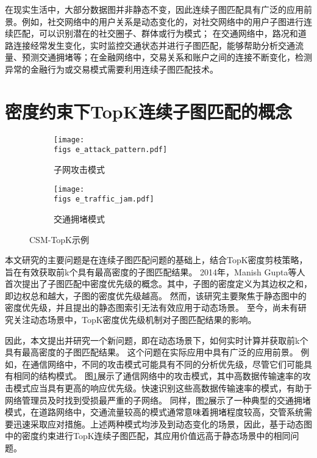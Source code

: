 在现实生活中，大部分数据图并非静态不变，因此连续子图匹配具有广泛的应用前景。例如，社交网络中的用户关系是动态变化的，对社交网络中的用户子图进行连续匹配，可以识别潜在的社交圈子、群体或行为模式；
在交通网络中，路况和道路连接经常发生变化，实时监控交通状态并进行子图匹配，能够帮助分析交通流量、预测交通拥堵等；在金融网络中，交易关系和账户之间的连接不断变化，检测异常的金融行为或交易模式需要利用连续子图匹配技术。


\section{密度约束下TopK连续子图匹配的概念}
\begin{figure}[h!]
    \def\wscorevone{0.49}
    \centering
        \begin{subfigure}[t]{\wscorevone\linewidth}
            \centering
            \resizebox{\linewidth}{!}
            {
                \texttt{[image: \\figs e\_attack\_pattern.pdf]}
            }
            \caption{子网攻击模式~\cite{static-topk-Gupta-DBLP:conf/icde/GuptaGYCH14}}
            \label{fig:example_attack_pattern}
        \end{subfigure}
        \hfill
        \begin{subfigure}[t]{\wscorevone\linewidth}
            \centering
            \resizebox{\linewidth}{!}
            {
                \texttt{[image: \\figs e\_traffic\_jam.pdf]}
            }
            \caption{交通拥堵模式~\cite{traffic-graph-matching-DBLP:journals/pvldb/SongGCW14}}
            \label{fig:example_traffic_jam}
        \end{subfigure}
        \label{fig:definition}
        \caption{CSM-TopK示例}
    \end{figure}
本文研究的主要问题是在连续子图匹配问题的基础上，结合TopK密度剪枝策略，旨在有效获取前k个具有最高密度的子图匹配结果。
2014年，Manish Gupta等人首次提出了子图匹配中密度优先级的概念\cite{static-topk-Gupta-DBLP:conf/icde/GuptaGYCH14}。其中，子图的密度定义为其边权之和，即边权总和越大，子图的密度优先级越高。
然而，该研究主要聚焦于静态图中的密度优先级，并且提出的静态图索引无法有效应用于动态场景。
至今，尚未有研究关注动态场景中，TopK密度优先级机制对子图匹配结果的影响。

因此，本文提出并研究一个新问题，即在动态场景下，如何实时计算并获取前k个具有最高密度的子图匹配结果。
这个问题在实际应用中具有广泛的应用前景。
例如，在通信网络中，不同的攻击模式可能具有不同的分析优先级，尽管它们可能具有相同的结构模式。
图\ref{fig:example_attack_pattern}展示了通信网络中的攻击模式\cite{static-topk-Gupta-DBLP:conf/icde/GuptaGYCH14}，其中高数据传输速率的攻击模式应当具有更高的响应优先级。快速识别这些高数据传输速率的模式，有助于网络管理员及时找到受损最严重的子网络。
同样，图\ref{fig:example_traffic_jam}展示了一种典型的交通拥堵模式\cite{traffic-graph-matching-DBLP:journals/pvldb/SongGCW14}，在道路网络中，交通流量较高的模式通常意味着拥堵程度较高，交管系统需要迅速采取应对措施。上述两种模式均涉及到动态变化的场景，因此，基于动态图中的密度约束进行TopK连续子图匹配，其应用价值远高于静态场景中的相同问题。

